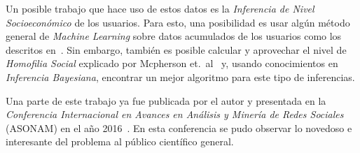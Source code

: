 \documentclass{article}
\begin{document}
Un posible trabajo que hace uso de estos datos es la \emph{Inferencia de Nivel Socioeconómico} de los usuarios. Para esto, una posibilidad es usar algún método general de \emph{Machine Learning} sobre datos acumulados de los usuarios como los descritos en~\cite{oskardottir2016}. Sin embargo, también es posible calcular y aprovechar el nivel de \emph{Homofilia Social} explicado por Mcpherson et.\ al~\cite{mcpherson2001birds} y, usando conocimientos en \emph{Inferencia Bayesiana}, encontrar un mejor algoritmo para este tipo de inferencias.

Una parte de este trabajo ya fue publicada por el autor y presentada en la \emph{Conferencia Internacional en Avances en Análisis y Minería de Redes Sociales} (ASONAM) en el año 2016~\cite{fixmanasonam2016}. En esta conferencia se pudo observar lo novedoso e interesante del problema al público científico general.

{}
\end{document}
